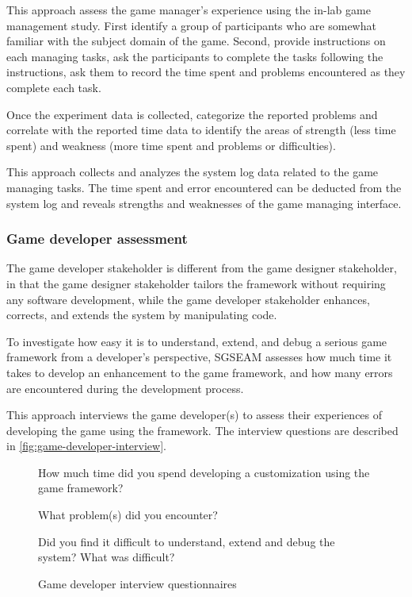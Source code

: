 \label{In-lab game management study}

This approach assess the game manager's experience using the in-lab game management study.  First identify a group 
of participants who are somewhat familiar with the subject domain of the game. Second, provide instructions on 
each managing tasks, ask the participants to complete the tasks following the instructions, ask them to record 
the time spent and problems encountered as they complete each task.

Once the experiment data is collected, categorize the reported problems and correlate with the reported time data 
to identify the areas of strength (less time spent) and weakness (more time spent and problems or difficulties). 

\label{Game management log data analysis}

This approach collects and analyzes the system log data related to the game managing tasks. The time spent and error encountered can be deducted from the system log and reveals strengths and weaknesses of the game managing interface.

\subsubsection{Game developer assessment}

The game developer stakeholder is different from the game designer stakeholder, in that the
game designer stakeholder tailors the framework without requiring any software
development, while the game developer stakeholder enhances, corrects, and extends the system by
manipulating code. 

To investigate how easy it is to understand, extend, and debug a serious game framework from a developer's 
perspective, SGSEAM assesses how much time it takes to develop an
enhancement to the game framework, and how many errors are encountered
during the development process.

\label{Post-hoc game developer interview}

This approach interviews the game developer(s) to assess their experiences of developing the game 
using the framework. The interview questions are described in \autoref{fig:game-developer-interview}.  
 
\begin{figure}[ht!]
\begin{mybox}
\begin{compactenum}
\item How much time did you spend developing a customization using the game framework?
\item What problem(s) did you encounter?
\item Did you find it difficult to understand, extend and debug the system? What was difficult?
\end{compactenum}
\end{mybox}
\caption{Game developer interview questionnaires}
\label{fig:game-developer-interview}  
\end{figure}

